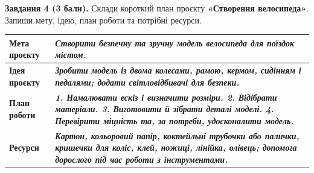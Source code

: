 \documentclass[11pt,a4paper]{article}
\newcommand{\answer}[1]{\textbf{\textit{#1}}}
\begin{document}
\textbf{Завдання 4 (3 бали).} Склади короткий план проєкту \textbf{«Створення велосипеда»}. Запиши мету, ідею, план роботи та потрібні ресурси.\par
\begin{tabularx}{\linewidth}{|>{\raggedright\arraybackslash}p{43mm}|Y|}\hline
\textbf{Мета проєкту} & \answer{Створити безпечну та зручну модель велосипеда для поїздок містом.}\\\hline
\textbf{Ідея проєкту} & \answer{Зробити модель із двома колесами, рамою, кермом, сидінням і педалями; додати світловідбивачі для безпеки.}\\\hline
\textbf{План роботи} & \answer{1. Намалювати ескіз і визначити розміри. 2. Відібрати матеріали. 3. Виготовити й зібрати деталі моделі. 4. Перевірити міцність та, за потреби, удосконалити модель.}\\\hline
\textbf{Ресурси} & \answer{Картон, кольоровий папір, коктейльні трубочки або палички, кришечки для коліс, клей, ножиці, лінійка, олівець; допомога дорослого під час роботи з інструментами.}\\\hline
\end{tabularx}
\end{document}
